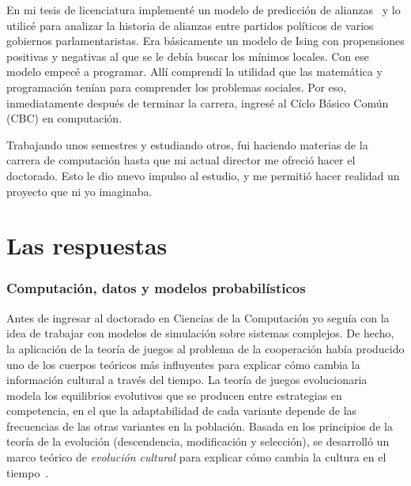 \documentclass[a4paper,11pt]{book}
\theoremstyle{definition}
\begin{document}
%

En mi tesis de licenciatura implement\'e un modelo de predicci\'on de alianzas~\cite{axelrod1993} y lo utilic\'e para analizar la historia de alianzas entre partidos pol\'iticos de varios gobiernos parlamentaristas.
%
Era b\'asicamente un modelo de Ising con propensiones positivas y negativas al que se le deb\'ia buscar los m\'inimos locales.
%
Con ese modelo empec\'e a programar.
%
All\'i comprend\'i la utilidad que las matem\'atica y programaci\'on ten\'ian para comprender los problemas sociales.
%
Por eso, inmediatamente despu\'es de terminar la carrera, ingres\'e al C\'iclo B\'asico Com\'un (CBC) en computaci\'on.


Trabajando unos semestres y estudiando otros, fui haciendo materias de la carrera de computaci\'on hasta que mi actual director me ofreci\'o hacer el doctorado.
%
Esto le dio nuevo impulso al estudio, y me permiti\'o hacer realidad un proyecto que ni yo imaginaba.


\section{Las respuestas}


\subsubsection{Computaci\'on, datos y modelos probabil\'isticos}

Antes de ingresar al doctorado en Ciencias de la Computaci\'on yo segu\'ia con la idea de trabajar con modelos de simulaci\'on sobre sistemas complejos.
%
De hecho, la aplicaci\'on de la teor\'ia de juegos al problema de la cooperaci\'on hab\'ia producido uno de los cuerpos te\'oricos m\'as influyentes  para explicar c\'omo cambia la informaci\'on cultural a trav\'es del tiempo.
%
La teor\'ia de juegos evolucionaria \cite{taylor1978-replicatorDynamic, maynardSmith1982-evolutionGameTheory} modela los equilibrios evolutivos que se producen entre estrategias en competencia, en el que la adaptabilidad de cada variante depende de las frecuencias de las otras variantes en la poblaci\'on.
%
Basada en los principios de la teor\'ia de la evoluci\'on (descendencia, modificaci\'on y selecci\'on), se desarroll\'o un marco te\'orico de \emph{evoluci\'on cultural} para explicar c\'omo cambia la cultura en el tiempo~\cite{boyd1985-evolutionaryProcess, boyd2005-origin}.
\end{document}
